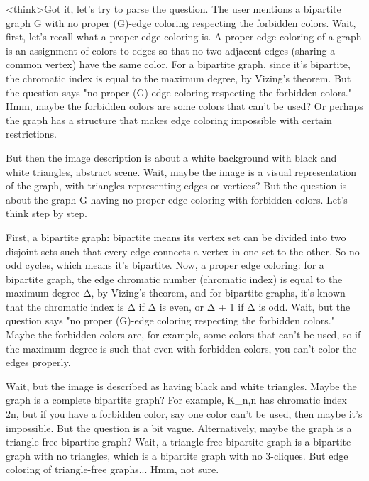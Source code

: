 <think>Got it, let's try to parse the question. The user mentions a bipartite graph G with no proper (G)-edge coloring respecting the forbidden colors. Wait, first, let's recall what a proper edge coloring is. A proper edge coloring of a graph is an assignment of colors to edges so that no two adjacent edges (sharing a common vertex) have the same color. For a bipartite graph, since it's bipartite, the chromatic index is equal to the maximum degree, by Vizing's theorem. But the question says "no proper (G)-edge coloring respecting the forbidden colors." Hmm, maybe the forbidden colors are some colors that can't be used? Or perhaps the graph has a structure that makes edge coloring impossible with certain restrictions.

But then the image description is about a white background with black and white triangles, abstract scene. Wait, maybe the image is a visual representation of the graph, with triangles representing edges or vertices? But the question is about the graph G having no proper edge coloring with forbidden colors. Let's think step by step.

First, a bipartite graph: bipartite means its vertex set can be divided into two disjoint sets such that every edge connects a vertex in one set to the other. So no odd cycles, which means it's bipartite. Now, a proper edge coloring: for a bipartite graph, the edge chromatic number (chromatic index) is equal to the maximum degree Δ, by Vizing's theorem, and for bipartite graphs, it's known that the chromatic index is Δ if Δ is even, or Δ + 1 if Δ is odd. Wait, but the question says "no proper (G)-edge coloring respecting the forbidden colors." Maybe the forbidden colors are, for example, some colors that can't be used, so if the maximum degree is such that even with forbidden colors, you can't color the edges properly.

Wait, but the image is described as having black and white triangles. Maybe the graph is a complete bipartite graph? For example, K_{n,n} has chromatic index 2n, but if you have a forbidden color, say one color can't be used, then maybe it's impossible. But the question is a bit vague. Alternatively, maybe the graph is a triangle-free bipartite graph? Wait, a triangle-free bipartite graph is a bipartite graph with no triangles, which is a bipartite graph with no 3-cliques. But edge coloring of triangle-free graphs... Hmm, not sure.

